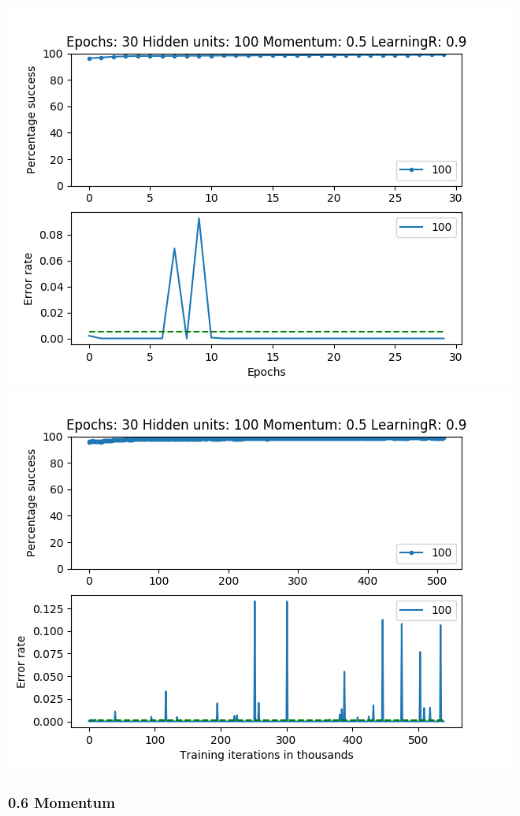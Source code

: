 \documentclass[11pt]{article}
\makeatletter
\def\maxwidth{\ifdim\Gin@nat@width>\linewidth\linewidth
    \else\Gin@nat@width\fi}
\let\Oldincludegraphics\includegraphics
\renewcommand{\includegraphics}[1]{\Oldincludegraphics[width=.8\maxwidth]{#1}}
\makeatother
\begin{document}
\includegraphics{Experiment1/E1_NN_Epoch_Momentum_0.5_30Epochs_100_LR_0.9_Hiddenunits.png}
\includegraphics{Experiment1/E1_NN_Training_Momentum_0.5_30Epochs_100_LR_0.9_Hiddenunits.png}

\hypertarget{momentum-6}{%
\paragraph{0.6 Momentum}\label{momentum-6}}
\end{document}
